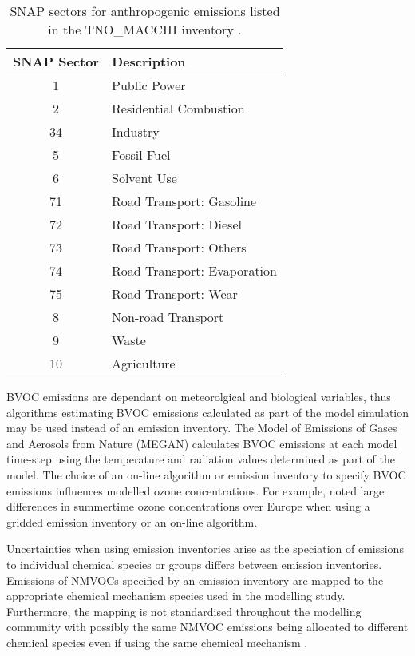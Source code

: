 \begin{table}[t]
    \centering
    \caption[SNAP sectors in the TNO\_MACCIII]{SNAP sectors for anthropogenic emissions listed in the TNO\_MACCIII inventory \citep{Kuenen:2014}.}
    \begin{tabular}{cl}
        \hline \hline
        \textbf{SNAP Sector} & \textbf{Description} \\
        \hline \hline
        1 & Public Power \\
        2 & Residential Combustion \\
        34 & Industry \\
        5 & Fossil Fuel \\
        6 & Solvent Use \\
        71 & Road Transport: Gasoline \\
        72 & Road Transport: Diesel \\
        73 & Road Transport: Others \\
        74 & Road Transport: Evaporation \\
        75 & Road Transport: Wear \\
        8 & Non-road Transport \\
        9 & Waste \\
        10 & Agriculture \\
        \hline \hline
    \end{tabular}
    \label{t:SNAP}
\end{table}

BVOC emissions are dependant on meteorolgical and biological variables, thus algorithms estimating BVOC emissions calculated as part of the model simulation may be used instead of an emission inventory.
The Model of Emissions of Gases and Aerosols from Nature (MEGAN) \citep{Guenther:2006, Guenther:2012} calculates BVOC emissions at each model time-step using the temperature and radiation values determined as part of the model.
The choice of an on-line algorithm or emission inventory to specify BVOC emissions influences modelled ozone concentrations. 
For example, \citet{Curci:2009} noted large differences in summertime ozone concentrations over Europe when using a gridded emission inventory or an on-line algorithm.

Uncertainties when using emission inventories arise as the speciation of emissions to individual chemical species or groups differs between emission inventories.
Emissions of NMVOCs specified by an emission inventory are mapped to the appropriate chemical mechanism species used in the modelling study.
Furthermore, the mapping is not standardised throughout the modelling community with possibly the same NMVOC emissions being allocated to different chemical species even if using the same chemical mechanism \citep{Carter:2015}.

